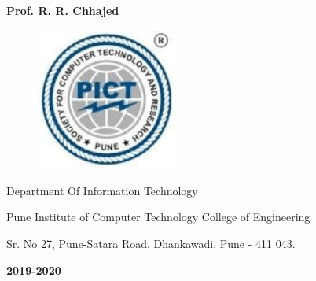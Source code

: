 \documentclass[a4paper, 12pt]{article}
\begin{document}
\begin{titlepage}
\begin{center}
{\fontsize{16pt}{19.2pt}\selectfont \textbf{\textcolor[HTML]{FF0000}{\Large Prof. R. R. Chhajed}}\par}
\end{center}
\vspace{\baselineskip}
\begin{figure}[H]
    \centering
		\includegraphics[width=1.84in,height=1.84in]{Pict_logo.png}
\end{figure}
\begin{center}
{\large Department Of Information Technology}
\end{center}

\begin{center}
{\Large Pune Institute of Computer Technology College of Engineering}
\end{center}

\begin{center}
Sr. No 27, Pune-Satara Road, Dhankawadi, Pune - 411 043.\textbf{ }
\end{center}

\begin{center}
\textbf{{\Large 2019-2020}}
\end{center}
\end{titlepage}
\pagebreak
\end{document}
